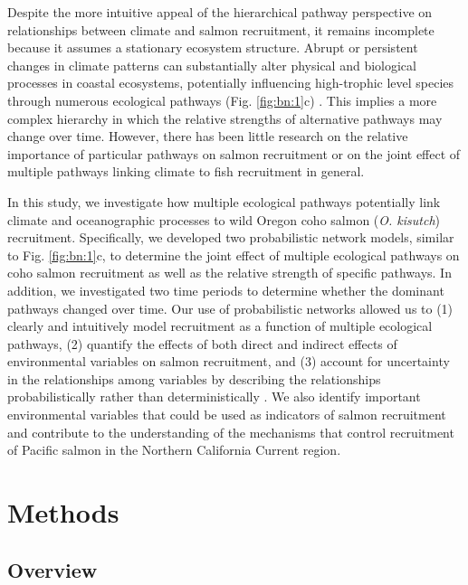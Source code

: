 Despite the more intuitive appeal of the hierarchical pathway perspective on
relationships between climate and salmon recruitment, it remains incomplete
because it assumes a stationary ecosystem structure.  Abrupt or persistent
changes in climate patterns can substantially alter physical and biological
processes in coastal ecosystems, potentially influencing high-trophic level
species through numerous ecological pathways (Fig. \ref{fig:bn:1}c) \citep{Anderson1999a,
Mantua1997a}. This implies a more complex hierarchy in which the relative
strengths of alternative pathways may change over time. However, there has been
little research on the relative importance of particular pathways on salmon
recruitment or on the joint effect of multiple pathways linking climate to fish
recruitment in general.

In this study, we investigate how multiple ecological pathways potentially link
climate and oceanographic processes to wild Oregon coho salmon (\emph{O.
kisutch}) recruitment. Specifically, we developed two probabilistic network
models, similar to Fig. \ref{fig:bn:1}c, to determine the joint effect of multiple ecological
pathways on coho salmon recruitment as well as the relative strength of specific
pathways. In addition, we investigated two time periods to determine whether the
dominant pathways changed over time. Our use of probabilistic networks allowed
us to (1) clearly and intuitively model recruitment as a function of multiple
ecological pathways, (2) quantify the effects of both direct and indirect
effects of environmental variables on salmon recruitment, and (3) account for
uncertainty in the relationships among variables by describing the relationships
probabilistically rather than deterministically \citep{Varis1995a}. We also
identify important environmental variables that could be used as indicators of
salmon recruitment and contribute to the understanding of the mechanisms that
control recruitment of Pacific salmon in the Northern California Current region.



\section{Methods}

\subsection{Overview}


